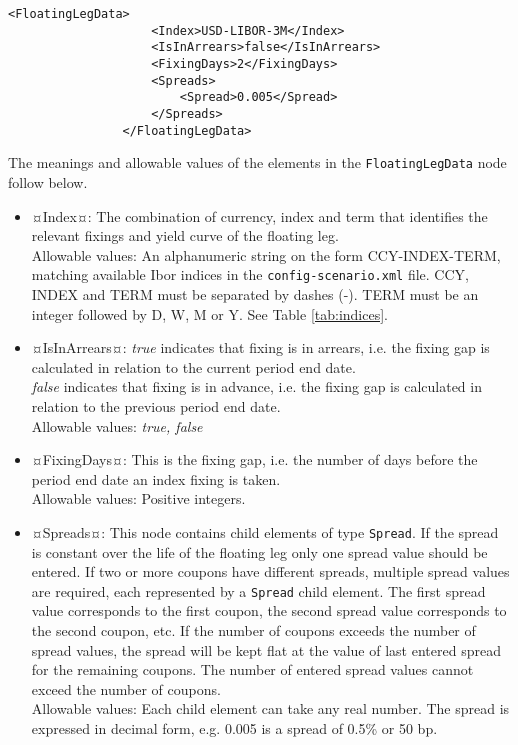 \begin{lstlisting}[caption=FloatingLegData, label=lst:floatingleg_data]
                <FloatingLegData>
                    <Index>USD-LIBOR-3M</Index>
                    <IsInArrears>false</IsInArrears>
                    <FixingDays>2</FixingDays>
                    <Spreads>
                        <Spread>0.005</Spread>
                    </Spreads>
                </FloatingLegData>
\end{lstlisting}

The meanings and allowable values of the elements in the \lstinline!FloatingLegData! node follow below.

\begin{itemize}
\item ¤Index¤:  The combination of currency, index and term that identifies the relevant fixings and yield curve of the floating leg.  \\ Allowable values:  An alphanumeric string on the form CCY-INDEX-TERM,  matching available Ibor indices in the {\tt config-scenario.xml} file. CCY, INDEX and TERM must be separated by dashes (-). TERM must be an integer followed by D, W, M or Y. See Table \ref{tab:indices}.
\item ¤IsInArrears¤:  \emph{true} indicates that  fixing is in arrears, i.e. the fixing gap is calculated in relation to the current period end date.\\ \emph{false} indicates that  fixing is in advance, i.e. the fixing gap is calculated in relation to the previous period end date.  \\ Allowable values:  \emph{true, false}
\item ¤FixingDays¤: This is the fixing gap, i.e. the number of days before the period end date an index fixing is taken.   \\ Allowable values:  Positive integers.  
\item ¤Spreads¤: This node contains child elements of type \lstinline!Spread!. If the spread is constant over the life of the floating leg only one spread value should be entered. If two or more coupons have different spreads, multiple spread values are required, each represented by a \lstinline!Spread! child element. The first spread value corresponds to the first coupon, the second spread value corresponds to the second coupon, etc. If the number of coupons exceeds the number of spread values, the spread will be kept flat at the value of last entered spread for the remaining coupons.  The number of entered spread values cannot exceed the number of coupons. \\Allowable values: Each child element can take any  real number. The spread is expressed in decimal form, e.g. 0.005 is a spread of 0.5\% or 50 bp.
\end{itemize}




